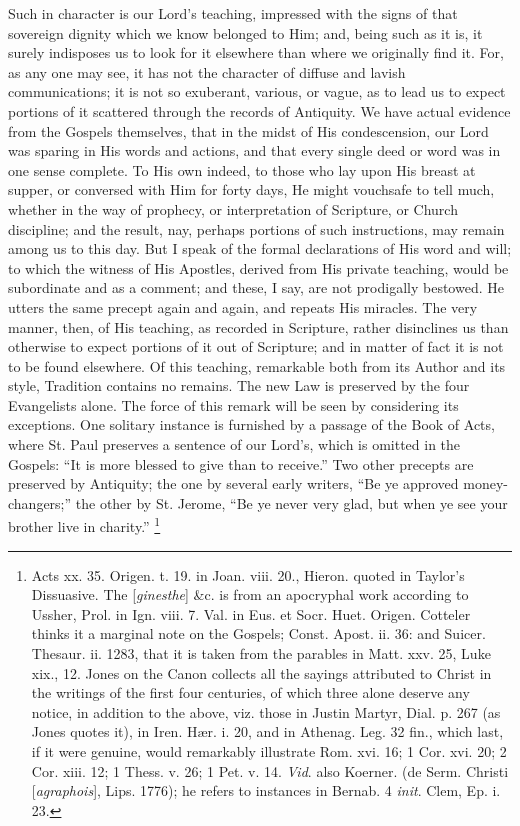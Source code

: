 Such in character is our Lord's teaching, impressed with the signs
of that sovereign dignity which we know belonged to Him; and, being
such as it is, it surely indisposes us to look for it elsewhere than
where we originally find it. For, as any one may see, it has not the
character of diffuse and lavish communications; it is not so
exuberant, various, or vague, as to lead us to expect portions of it
scattered through the records of Antiquity. We have actual evidence
from the Gospels themselves, that in the midst of His condescension,
our Lord was sparing in His words and actions, and that every single
deed or word was in one sense complete. To His own indeed, to those
who lay upon His breast at supper, or conversed with Him for forty
days, He might vouchsafe to tell much, whether in the way of prophecy,
or interpretation of Scripture, or Church discipline; and the result,
nay, perhaps portions of such instructions, may remain among us to
this day. But I speak of the formal declarations of His word and will;
to which the witness of His Apostles, derived from His private
teaching, would be subordinate and as a comment; and these, I say, are
not prodigally bestowed. He utters the same precept again and again,
and repeats His miracles. The very manner, then, of His teaching, as
recorded in Scripture, rather disinclines us than otherwise to expect
portions of it out of Scripture; and in matter of fact it is not to be
found elsewhere. Of this teaching, remarkable both from its Author and
its style, Tradition contains no remains. The new Law is preserved by
the four Evangelists alone. The force of this remark will be seen by
considering its exceptions. One solitary instance is furnished
by a passage of the Book of Acts, where St. Paul preserves a sentence
of our Lord's, which is omitted in the Gospels: ``It is more
blessed to give than to receive.'' Two other precepts are
preserved by Antiquity; the one by several early writers, ``Be ye
approved money-changers;'' the other by St. Jerome, ``Be ye
never very glad, but when ye see your brother live in charity.'' \footnote{Acts xx. 35. Origen. t. 19. in Joan. viii.
20., Hieron. quoted in Taylor's Dissuasive. The [\emph{ginesthe}]
\&c. is from an apocryphal work according to Ussher, Prol. in Ign.
viii. 7. Val. in Eus. et Socr. Huet. Origen. Cotteler thinks it a
marginal note on the Gospels; Const. Apost. ii. 36: and Suicer.
Thesaur. ii. 1283, that it is taken from the parables in Matt. xxv.
25, Luke xix., 12. Jones on the Canon collects all the sayings
attributed to Christ in the writings of the first four centuries, of
which three alone deserve any notice, in addition to the above, viz.
those in Justin Martyr, Dial. p. 267 (as Jones quotes it), in Iren.
Hær. i. 20, and in Athenag. Leg. 32 fin., which last, if it were
genuine, would remarkably illustrate Rom. xvi. 16; 1 Cor. xvi. 20; 2
Cor. xiii. 12; 1 Thess. v. 26; 1 Pet. v. 14. \emph{Vid}. also Koerner.
(de Serm. Christi [\emph{agraphois}], Lips. 1776); he refers to
instances in Bernab. 4 \emph{init}. Clem, Ep. i. 23.}

